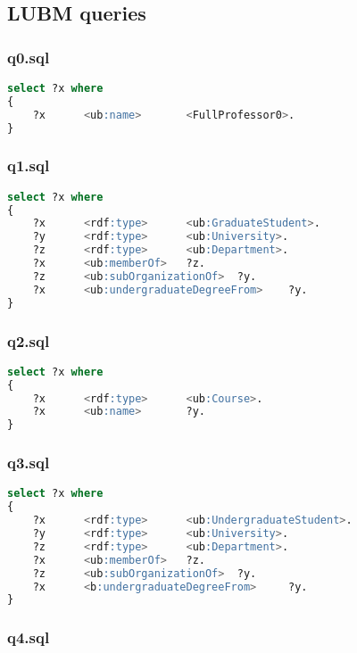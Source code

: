 \documentclass[titlepage, a4paper, 12pt] {article}
\begin{document}
\subsection{LUBM queries}\label{lubm}

\subsubsection{q0.sql}

\begin{lstlisting}[language=SQL] 
select ?x where
{
	?x      <ub:name>       <FullProfessor0>.
}
\end{lstlisting}

\subsubsection{q1.sql}

\begin{lstlisting}[language=SQL]
select ?x where
{
	?x      <rdf:type>      <ub:GraduateStudent>.
	?y      <rdf:type>      <ub:University>.
	?z      <rdf:type>      <ub:Department>.
	?x      <ub:memberOf>   ?z.
	?z      <ub:subOrganizationOf>  ?y.
	?x      <ub:undergraduateDegreeFrom>    ?y.
}
\end{lstlisting}

\subsubsection{q2.sql}

\begin{lstlisting}[language=SQL]
select ?x where
{
	?x      <rdf:type>      <ub:Course>.
	?x      <ub:name>       ?y.
}  
\end{lstlisting}

\subsubsection{q3.sql}

\begin{lstlisting}[language=SQL]
select ?x where
{
	?x      <rdf:type>      <ub:UndergraduateStudent>.
	?y      <rdf:type>      <ub:University>.
	?z      <rdf:type>      <ub:Department>.
	?x      <ub:memberOf>   ?z.
	?z      <ub:subOrganizationOf>  ?y.
	?x      <b:undergraduateDegreeFrom>     ?y.
}
\end{lstlisting}

\subsubsection{q4.sql}
\end{document}
